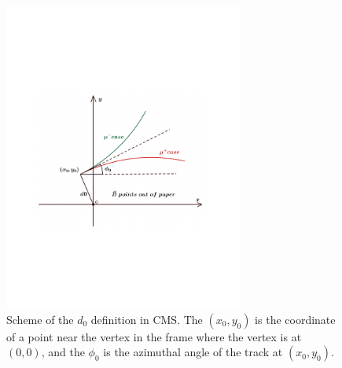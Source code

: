 \begin{figure}[!htb]
      \centering
      \captionsetup{justification=justified}
      \includegraphics[width=0.70\textwidth]{pics/muon_corr/GeoFit/d0_def.pdf}
      \caption{Scheme of the $d_0$ definition in CMS. The $(x_{0}, y_{0})$ is the coordinate of 
               a point near the vertex in the frame where the vertex is at $(0,0)$, 
               and the $\phi_{0}$ is the azimuthal angle of the track at $(x_{0}, y_{0})$.}
      \label{fig:d0_def}
\end{figure}


